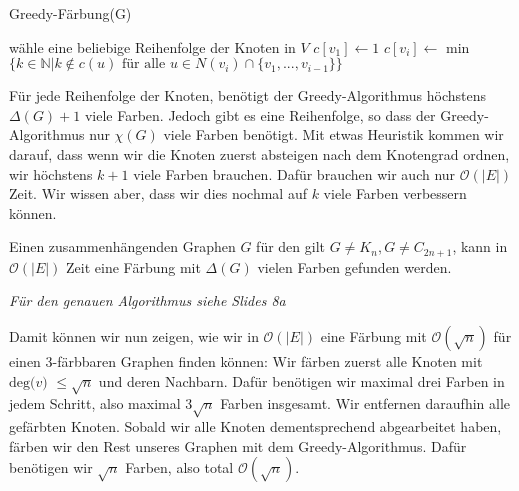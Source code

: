 \begin{algorithm}
    \caption{Greedy-Färbung(G)}
    \begin{algorithmic}[1]
        \State wähle eine beliebige Reihenfolge der Knoten in $V$
        \State $c[v_1] \leftarrow 1$
            \State $c[v_i] \leftarrow$ min$\{ k \in \mathbb{N} | k \notin c(u) \text{ für alle } u \in N(v_i) \cap \{v_1, ... , v_{i-1}\} \}$
        \EndFor
    \end{algorithmic}
\end{algorithm}

Für jede Reihenfolge der Knoten, benötigt der Greedy-Algorithmus höchstens $\Delta (G) + 1$ viele Farben.
Jedoch gibt es eine Reihenfolge, so dass der Greedy-Algorithmus nur $\chi (G)$ viele Farben benötigt.
Mit etwas Heuristik kommen wir darauf, dass wenn wir die Knoten zuerst absteigen nach dem Knotengrad
ordnen, wir höchstens $k+1$ viele Farben brauchen. Dafür brauchen wir auch nur $\mathcal{O}(|E|)$ Zeit.
Wir wissen aber, dass wir dies nochmal auf $k$ viele Farben verbessern können.

\begin{satz}
    Einen zusammenhängenden Graphen $G$ für den gilt $G \neq K_n, G \neq C_{2n+1}$, kann in $\mathcal{O}(|E|)$
    Zeit eine Färbung mit $\Delta(G)$ vielen Farben gefunden werden.
\end{satz}
\textit{Für den genauen Algorithmus siehe Slides 8a} \bigskip

Damit können wir nun zeigen, wie wir in $\mathcal{O}(|E|)$ eine Färbung mit $\mathcal{O}(\sqrt{n})$ für 
einen 3-färbbaren Graphen finden können: Wir färben zuerst alle Knoten mit $\text{deg($v$) } \leq \sqrt{n}$ 
und deren Nachbarn. Dafür benötigen wir maximal drei Farben in jedem Schritt, also maximal $3\sqrt{n}$ 
Farben insgesamt. Wir entfernen daraufhin alle gefärbten Knoten. Sobald wir alle Knoten dementsprechend 
abgearbeitet haben, färben wir den Rest unseres Graphen mit dem Greedy-Algorithmus. Dafür benötigen wir 
$\sqrt{n}$ Farben, also total $\mathcal{O}(\sqrt{n})$.